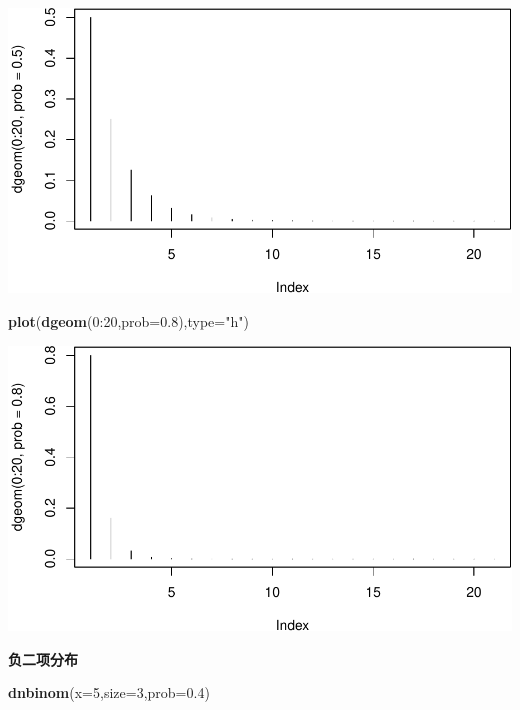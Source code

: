 \documentclass[]{article}
\newenvironment{Shaded}{\begin{snugshade}}{\end{snugshade}}
\newcommand{\KeywordTok}[1]{\textcolor[rgb]{0.13,0.29,0.53}{\textbf{{#1}}}}
\newcommand{\DataTypeTok}[1]{\textcolor[rgb]{0.13,0.29,0.53}{{#1}}}
\newcommand{\DecValTok}[1]{\textcolor[rgb]{0.00,0.00,0.81}{{#1}}}
\newcommand{\FloatTok}[1]{\textcolor[rgb]{0.00,0.00,0.81}{{#1}}}
\newcommand{\StringTok}[1]{\textcolor[rgb]{0.31,0.60,0.02}{{#1}}}
\newcommand{\NormalTok}[1]{{#1}}
\begin{document}
\includegraphics{probability_files/figure-latex/unnamed-chunk-13-1.pdf}

\begin{Shaded}
\begin{Highlighting}[]
\KeywordTok{plot}\NormalTok{(}\KeywordTok{dgeom}\NormalTok{(}\DecValTok{0}\NormalTok{:}\DecValTok{20}\NormalTok{,}\DataTypeTok{prob=}\FloatTok{0.8}\NormalTok{),}\DataTypeTok{type=}\StringTok{"h"}\NormalTok{)}
\end{Highlighting}
\end{Shaded}

\includegraphics{probability_files/figure-latex/unnamed-chunk-13-2.pdf}

\textbf{负二项分布}

\begin{Shaded}
\begin{Highlighting}[]
\KeywordTok{dnbinom}\NormalTok{(}\DataTypeTok{x=}\DecValTok{5}\NormalTok{,}\DataTypeTok{size=}\DecValTok{3}\NormalTok{,}\DataTypeTok{prob=}\FloatTok{0.4}\NormalTok{)   }
\end{Highlighting}
\end{Shaded}
\end{document}
